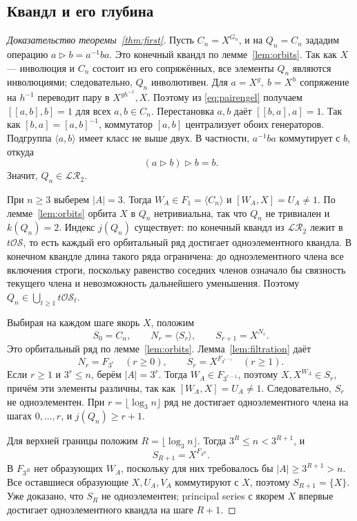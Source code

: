 \documentclass[11pt,a4paper]{article}
\theoremstyle{definition}
\theoremstyle{remark}
\newcommand{\LR}{\mathcal{LR}}
\newcommand{\tOS}{t\mathcal{OS}}
\newcommand{\conj}{\triangleright}
\begin{document}
\subsection{Квандл и его глубина}

\begin{proof}[Доказательство теоремы~\ref{thm:first}]
Пусть \(C_n=X^{G_n}\), и на \(Q_n=C_n\)
зададим операцию \(a\conj b=a^{-1}ba\).
Это конечный квандл по лемме~\ref{lem:orbits}.
Так как \(X\) — инволюция и \(C_n\) состоит из его сопряжённых,
все элементы \(Q_n\) являются инволюциями; следовательно,
\(Q_n\) инволютивен.
Для \(a=X^g,\ b=X^h\) сопряжение на \(h^{-1}\)
переводит пару в \(X^{gh^{-1}},X\).
Поэтому из \eqref{eq:pairengel} получаем
\([[a,b],b]=1\) для всех \(a,b\in C_n\).
Перестановка \(a,b\) даёт \([[b,a],a]=1\).
Так как \([b,a]=[a,b]^{-1}\), коммутатор \([a,b]\)
централизует обоих генераторов. Подгруппа \(\langle a,b\rangle\)
имеет класс не выше двух.
В частности, \(a^{-1}ba\) коммутирует с \(b\), откуда
\[
 (a\conj b)\conj b=b.
\]
Значит, \(Q_n\in\LR_2\).

При \(n\ge3\) выберем \(|A|=3\).
Тогда \(W_A\in F_1=\langle C_n\rangle\)
и \([W_A,X]=U_A\ne1\).
По лемме~\ref{lem:orbits} орбита \(X\) в \(Q_n\)
нетривиальна, так что \(Q_n\) не тривиален и \(k(Q_n)=2\).
Индекс \(j(Q_n)\) существует:
по \cite[следствие~5.19]{BCNW} конечный квандл из \(\LR_2\)
лежит в \(\tOS\), то есть каждый его орбитальный ряд
достигает одноэлементного квандла.
В конечном квандле длина такого ряда ограничена:
до одноэлементного члена все включения строги,
поскольку равенство соседних членов означало бы
связность текущего члена и невозможность дальнейшего уменьшения.
Поэтому \(Q_n\in\bigcup_{t\ge1}\tOS_t\).

Выбирая на каждом шаге якорь \(X\), положим
\[
 S_0=C_n,\qquad N_r=\langle S_r\rangle,\qquad
 S_{r+1}=X^{N_r}.
\]
Это орбитальный ряд по лемме~\ref{lem:orbits}.
Лемма~\ref{lem:filtration} даёт
\[
 N_r=F_{3^r}\quad(r\ge0),\qquad
 S_r=X^{F_{3^{r-1}}}\quad(r\ge1).
\]
Если \(r\ge1\) и \(3^r\le n\), берём \(|A|=3^r\).
Тогда \(W_A\in F_{3^{r-1}}\), поэтому
\(X,X^{W_A}\in S_r\), причём эти элементы различны,
так как \([W_A,X]=U_A\ne1\).
Следовательно, \(S_r\) не одноэлементен.
При \(r=\lfloor\log_3n\rfloor\) ряд не достигает
одноэлементного члена на шагах \(0,\ldots,r\),
и \(j(Q_n)\ge r+1\).

Для верхней границы положим \(R=\lfloor\log_3n\rfloor\).
Тогда \(3^R\le n<3^{R+1}\), и
\[
S_{R+1}=X^{F_{3^R}}.
\]
В \(F_{3^R}\) нет образующих \(W_A\), поскольку для них требовалось бы
\(|A|\ge3^{R+1}>n\). Все оставшиеся образующие \(X,U_A,V_A\)
коммутируют с \(X\), поэтому \(S_{R+1}=\{X\}\). Уже доказано,
что \(S_R\) не одноэлементен; principal series с якорем \(X\) впервые
достигает одноэлементного квандла на шаге \(R+1\).


\end{proof}
\end{document}
